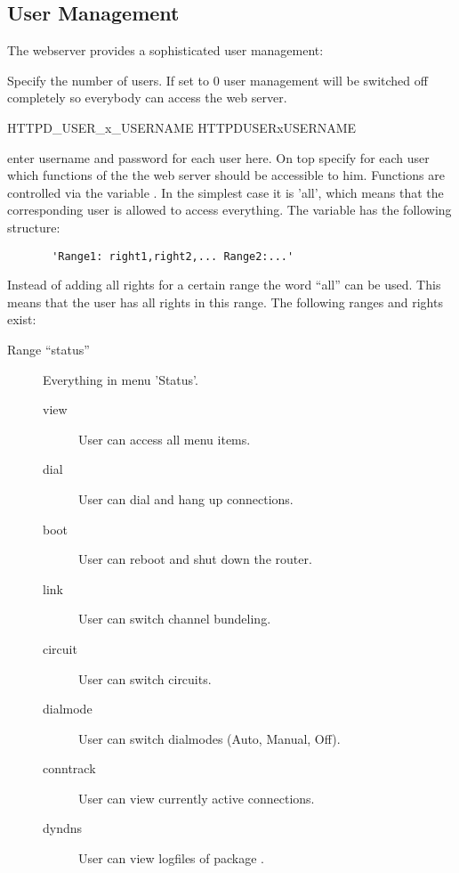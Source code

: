\subsection{User Management}
  The webserver provides a sophisticated user management:
\begin{description}
    {Specify the number of users. If set to 0 user management 
    will be switched off completely so everybody can access the 
    web server.}

       {HTTPD\_USER\_x\_USERNAME}
       {HTTPDUSERxUSERNAME}
   
    {enter username and password for each user here. On top specify for each 
    user which functions of the the web server should be accessible to him. 
    Functions are controlled via the variable . 
    In the simplest case it is 'all', which means that the corresponding user
    is allowed to access everything. The variable has the following 
    structure:

\begin{example}
\begin{verbatim}
       'Range1: right1,right2,... Range2:...'
\end{verbatim}
\end{example}

    Instead of adding all rights for a certain range the word ``all'' can be used.
    This means that the user has all rights in this range. The following ranges and 
    rights exist:

      \begin{description}
      \item[Range ``status''] Everything in menu 'Status'.
        \begin{description}
        \item[view] User can access all menu items.
        \item[dial] User can dial and hang up connections.
        \item[boot] User can reboot and shut down the router.
        \item[link] User can switch channel bundeling.
        \item[circuit] User can switch circuits.
        \item[dialmode] User can switch dialmodes (Auto, Manual, Off).
        \item[conntrack] User can view currently active connections.
        \item[dyndns] User can view logfiles of package .
       \end{description}


\end{description}}
\end{description}
